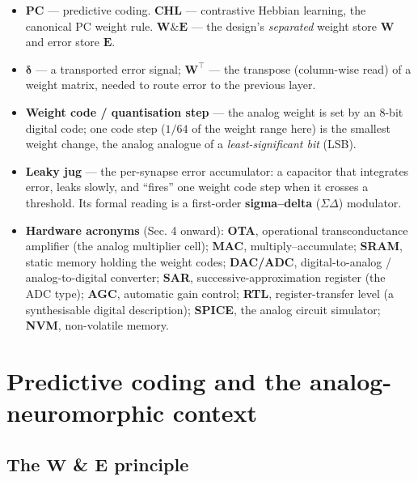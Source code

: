 \documentclass[11pt]{article}
\providecommand{\tightlist}{\setlength{\itemsep}{0pt}\setlength{\parskip}{0pt}}
\begin{document}
\begin{itemize}
\tightlist
\item
  \textbf{PC} --- predictive coding. \textbf{CHL} --- contrastive
  Hebbian learning, the canonical PC weight rule.
  \textbf{\(\bm W\&\bm E\)} --- the design's \emph{separated} weight
  store \(\bm W\) and error store \(\bm E\).
\item
  \textbf{\(\bm\delta\)} --- a transported error signal;
  \textbf{\(\bm W^{\!\top}\)} --- the transpose (column-wise read) of a
  weight matrix, needed to route error to the previous layer.
\item
  \textbf{Weight code / quantisation step} --- the analog weight is set
  by an 8-bit digital code; one code step (\(1/64\) of the weight range
  here) is the smallest weight change, the analog analogue of a
  \emph{least-significant bit} (LSB).
\item
  \textbf{Leaky jug} --- the per-synapse error accumulator: a capacitor
  that integrates error, leaks slowly, and ``fires'' one weight code
  step when it crosses a threshold. Its formal reading is a first-order
  \textbf{sigma--delta} (\(\Sigma\Delta\)) modulator.
\item
  \textbf{Hardware acronyms} (Sec. 4 onward): \textbf{OTA}, operational
  transconductance amplifier (the analog multiplier cell); \textbf{MAC},
  multiply--accumulate; \textbf{SRAM}, static memory holding the weight
  codes; \textbf{DAC/ADC}, digital-to-analog / analog-to-digital
  converter; \textbf{SAR}, successive-approximation register (the ADC
  type); \textbf{AGC}, automatic gain control; \textbf{RTL},
  register-transfer level (a synthesisable digital description);
  \textbf{SPICE}, the analog circuit simulator; \textbf{NVM},
  non-volatile memory.
\end{itemize}

\hypertarget{sec:pc}{%
\section{Predictive coding and the analog-neuromorphic
context}\label{sec:pc}}

\hypertarget{the-bm-w-bm-e-principle}{%
\subsection{\texorpdfstring{The \(\bm W\) \& \(\bm E\)
principle}{The \textbackslash bm W \& \textbackslash bm E principle}}\label{the-bm-w-bm-e-principle}}
\end{document}
